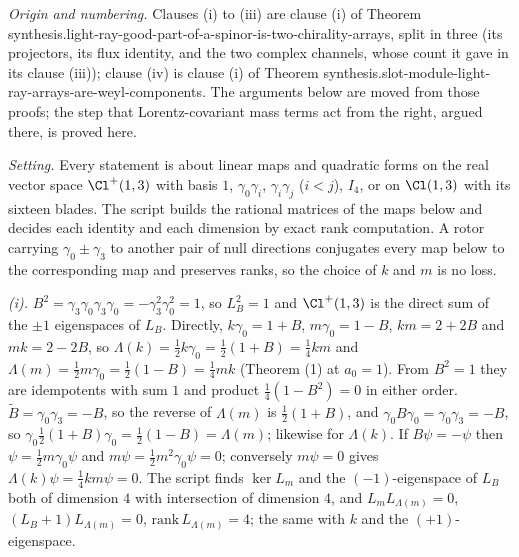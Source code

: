 \emph{Origin and numbering.} Clauses (i) to (iii) are clause (i) of Theorem synthesis.light-ray-good-part-of-a-spinor-is-two-chirality-arrays, split in three (its projectors, its flux identity, and the two complex channels, whose count it gave in its clause (iii)); clause (iv) is clause (i) of Theorem synthesis.slot-module-light-ray-arrays-are-weyl-components. The arguments below are moved from those proofs; the step that Lorentz-covariant mass terms act from the right, argued there, is proved here.

\emph{Setting.} Every statement is about linear maps and quadratic forms on the real vector space $\Cl^{+}(1,3)$ with basis $1$, $\gamma_{0}\gamma_{i}$, $\gamma_{i}\gamma_{j}$ ($i < j$), $I_{4}$, or on $\Cl(1,3)$ with its sixteen blades. The script builds the rational matrices of the maps below and decides each identity and each dimension by exact rank computation. A rotor carrying $\gamma_{0} \pm \gamma_{3}$ to another pair of null directions conjugates every map below to the corresponding map and preserves ranks, so the choice of $k$ and $m$ is no loss.

\emph{(i).} $B^{2} = \gamma_{3}\gamma_{0}\gamma_{3}\gamma_{0} = -\gamma_{3}^{2}\gamma_{0}^{2} = 1$, so $L_{B}^{2} = 1$ and $\Cl^{+}(1,3)$ is the direct sum of the $\pm1$ eigenspaces of $L_{B}$. Directly, $k\gamma_{0} = 1 + B$, $m\gamma_{0} = 1 - B$, $km = 2 + 2B$ and $mk = 2 - 2B$, so $\Lambda(k) = \tfrac12 k\gamma_{0} = \tfrac12(1 + B) = \tfrac14 km$ and $\Lambda(m) = \tfrac12 m\gamma_{0} = \tfrac12(1 - B) = \tfrac14 mk$ (Theorem (1) at $a_{0} = 1$). From $B^{2} = 1$ they are idempotents with sum $1$ and product $\tfrac14(1 - B^{2}) = 0$ in either order. $\tilde{B} = \gamma_{0}\gamma_{3} = -B$, so the reverse of $\Lambda(m)$ is $\tfrac12(1 + B)$, and $\gamma_{0}B\gamma_{0} = \gamma_{0}\gamma_{3} = -B$, so $\gamma_{0}\tfrac12(1 + B)\gamma_{0} = \tfrac12(1 - B) = \Lambda(m)$; likewise for $\Lambda(k)$. If $B\psi = -\psi$ then $\psi = \tfrac12 m\gamma_{0}\psi$ and $m\psi = \tfrac12 m^{2}\gamma_{0}\psi = 0$; conversely $m\psi = 0$ gives $\Lambda(k)\psi = \tfrac14 km\psi = 0$. The script finds $\ker L_{m}$ and the $(-1)$-eigenspace of $L_{B}$ both of dimension $4$ with intersection of dimension $4$, and $L_{m}L_{\Lambda(m)} = 0$, $(L_{B} + 1)L_{\Lambda(m)} = 0$, $\mathrm{rank}\,L_{\Lambda(m)} = 4$; the same with $k$ and the $(+1)$-eigenspace.

